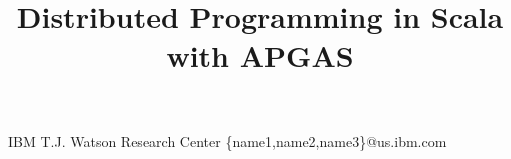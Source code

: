 \documentclass[preprint,10pt]{sigplanconf}
\begin{document}
\setlength{\pdfpageheight}{\paperheight}
\setlength{\pdfpagewidth}{\paperwidth}




\permissiontopublish             %


\title{Distributed Programming in Scala with APGAS}

           {IBM T.J. Watson Research Center}
           {\{name1,name2,name3\}@us.ibm.com}

\maketitle

\begin{abstract}

\end{abstract}


% 







%





\end{document}
